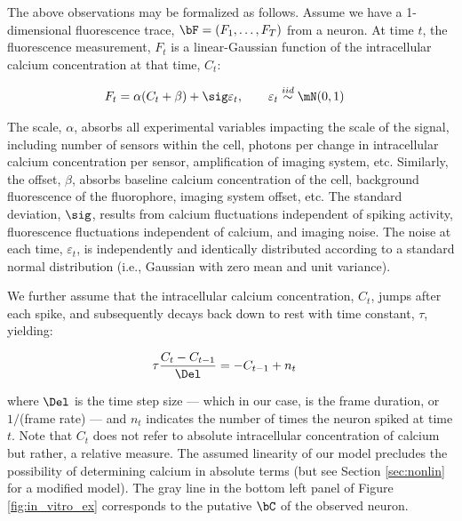 The above observations may be formalized as follows. Assume we have a 1-dimensional fluorescence trace, $\bF=(F_1, \ldots, F_T)$ from a neuron.  At time $t$, the fluorescence measurement, $F_t$ is a linear-Gaussian function of the intracellular calcium concentration at that time, $C_t$:

\begin{align} \label{eq:F}
F_t &= \alpha (C_t + \beta) + \sig \varepsilon_t, \qquad \varepsilon_t \overset{iid}{\sim} \mN(0,1)
\end{align}

\noindent The scale, $\alpha$, absorbs all experimental variables impacting the scale of the signal, including number of sensors within the cell, photons per change in intracellular calcium concentration per sensor, amplification of imaging system, etc.  Similarly, the offset, $\beta$, absorbs baseline calcium concentration of the cell, background fluorescence of the fluorophore, imaging system offset, etc.  The standard deviation, $\sig$, results from calcium fluctuations independent of spiking activity, fluorescence fluctuations independent of calcium, and imaging noise. The noise at each time, $\varepsilon_t$, is independently and identically distributed according to a standard normal distribution (i.e., Gaussian with zero mean and unit variance).  %

We further assume that the intracellular calcium concentration, $C_t$, jumps after each spike, and subsequently decays back down to rest with time constant, $\tau$, yielding:


\begin{align} \label{eq:C}
\tau \frac{C_t - C_{t-1}}{\Del} &= - C_{t-1} + n_t
\end{align}

\noindent where $\Del$ is the time step size --- which in our case, is the frame duration, or $1/$(frame rate) --- and $n_t$ indicates the number of times the neuron spiked at time $t$. %
Note that $C_t$ does not refer to absolute intracellular concentration of calcium but rather, a relative measure.  The assumed linearity of our model precludes the possibility of determining calcium in absolute terms (but see Section \ref{sec:nonlin} for a modified model).  The gray line in the bottom left panel of Figure \ref{fig:in_vitro_ex} corresponds to the putative $\bC$ of the observed neuron.  

